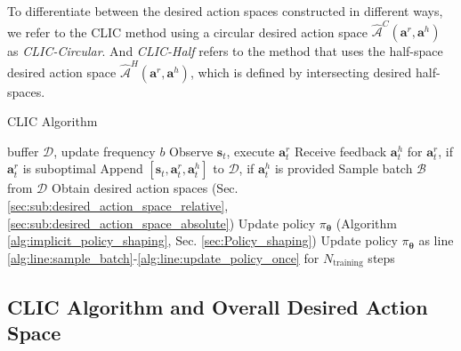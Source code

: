 To differentiate between the desired action spaces constructed in different ways, we refer to the CLIC method using a circular desired action space $\hat{\mathcal{A}}^C{(\bm a^r, \bm a^h)}$ as \emph{CLIC-Circular}. And \emph{CLIC-Half} refers to the method that uses the half-space desired action space $\hat{\mathcal{A}}^H{(\bm a^r, \bm a^h)}$, which is defined by intersecting desired half-spaces.



\begin{algorithm}[t]
        \caption{CLIC Algorithm}
        \label{alg:online_IIL}
        \begin{algorithmic}[1]
        \Require  buffer \( \mathcal D \), update frequency \( b \)
            \State Observe \( \bm s_t \), execute $\bm a^r_t$
            \State Receive feedback \(  \bm a^ h_t \) for \( \bm a^r_t\), if $\bm a^r_t$ is suboptimal
            \State Append \( [\bm s_t, \bm a^r_t, \bm a^ h_t] \) to \( \mathcal D \), if \(  \bm a^ h_t \) is provided \label{alg:line:aggregate_data_to_buffer}
             \label{alg:line:update_feq_b}
                \State Sample batch $\mathcal{B}$ from \( \mathcal D \) \label{alg:line:sample_batch}
                \State Obtain desired action spaces (Sec. \label{alg:line:desired_action_space}\ref{sec:sub:desired_action_space_relative}, \ref{sec:sub:desired_action_space_absolute})               
                \State Update policy \( \pi_{\bm \theta} \) (Algorithm \ref{alg:implicit_policy_shaping}, Sec. \ref{sec:Policy_shaping}) \label{alg:line:update_policy_once}
            \EndIf
        \EndFor
        \State Update policy \( \pi_{\bm \theta} \) as line \ref{alg:line:sample_batch}-\ref{alg:line:update_policy_once} for $N_{\text{training}}$ steps \label{alg:line:end_of_episode}
        \EndFor
        \end{algorithmic}
        \end{algorithm}



\subsection{CLIC Algorithm and Overall Desired Action Space}


